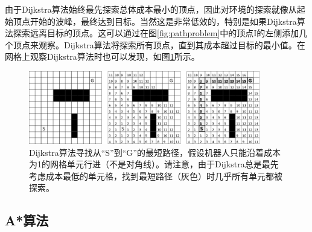 由于Dijkstra算法始终最先探索总体成本最小的顶点，因此对环境的探索就像从起始顶点开始的波峰，最终达到目标。当然这是非常低效的，特别是如果Dijkstra算法探索远离目标的顶点。这可以通过在图\ref{fig:pathproblem}中的顶点I的左侧添加几个顶点来观察。Dijkstra算法将探索所有顶点，直到其成本超过目标的最小值。在网格上观察Dijkstra算法时也可以发现，如图\ref{fig:dijkstragrid}所示。

\begin{figure}[htb]
\centering
\includegraphics[width=0.9\textwidth]{figs/dijkstragrid}
\caption{Dijkstra算法寻找从“S”到“G”的最短路径，假设机器人只能沿着成本为1的网格单元行进（不是对角线）。请注意，由于Dijkstra总是最先考虑成本最低的单元格，找到最短路径（灰色）时几乎所有单元都被探索。}
\label{fig:dijkstragrid}
\end{figure}

\subsection{A*算法}
\label{sec:astar}

